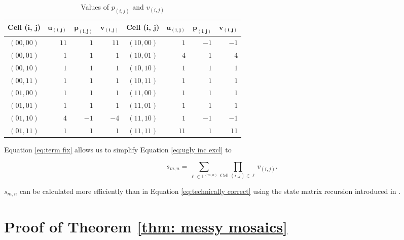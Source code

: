 \documentclass[12pt]{article}
\theoremstyle{plain}
\theoremstyle{definition}
\theoremstyle{remark}
\theoremstyle{definition}
\begin{document}
\begin{table}[h!]
    \begin{center}
        \begin{tabular}{ |c|r|r|r|c|r|r|r| } 
            \hline
            \textbf{Cell (}$\mathbf{i}$\textbf{,} $\mathbf{j}$\textbf{)} & $\mathbf{u_{(i,j)}}$ & $\mathbf{p_{(i,j)}}$ & $\mathbf{v_{(i,j)}}$ & \textbf{Cell (}$\mathbf{i}$\textbf{,} $\mathbf{j}$\textbf{)} & $\mathbf{u_{(i,j)}}$ & $\mathbf{p_{(i,j)}}$ & $\mathbf{v_{(i,j)}}$ \\ 
            \hline
            $(00, 00)$ & $11$ & $1$ & $11$ & $(10, 00)$ & $1$ & $-1$ & $-1$ \\
            \hline
            $(00, 01)$ & $1$ & $1$ & $1$ & $(10, 01)$ & $4$ & $1$ & $4$ \\
            \hline
            $(00, 10)$ & $1$ & $1$ & $1$ & $(10, 10)$ & $1$ & $1$ & $1$ \\
            \hline
            $(00, 11)$ & $1$ & $1$ & $1$ & $(10, 11)$ & $1$ & $1$ & $1$ \\
            \hline
            $(01, 00)$ & $1$ & $1$ & $1$ & $(11, 00)$ & $1$ & $1$ & $1$ \\
            \hline
            $(01, 01)$ & $1$ & $1$ & $1$ & $(11, 01)$ & $1$ & $1$ & $1$ \\
            \hline
            $(01, 10)$ & $4$ & $-1$ & $-4$ & $(11, 10)$ & $1$ & $-1$ & $-1$ \\
            \hline
            $(01, 11)$ & $1$ & $1$ & $1$ & $(11, 11)$ & $11$ & $1$ & $11$ \\
            \hline
        \end{tabular}
        \caption{Values of $p_{(i,j)}$ and $v_{(i,j)}$}
        \label{tbl:values of p and v}
    \end{center}
\end{table}

Equation \ref{eq:term fix} allows us to simplify Equation \ref{eq:ugly inc excl} to

\begin{equation}
    s_{m,n} = \sum_{\ell \in \mathbb{L}^{(m,n)}} \prod_{\text{Cell }(i,j) \in \ell} v_{(i,j)}.
\label{eq:technically correct}
\end{equation}

$s_{m,n}$ can be calculated more efficiently than in Equation \ref{eq:technically correct} using the state matrix recursion introduced in \cite{Oh2014}.

\section{Proof of Theorem \ref{thm: messy mosaics}}
\end{document}

